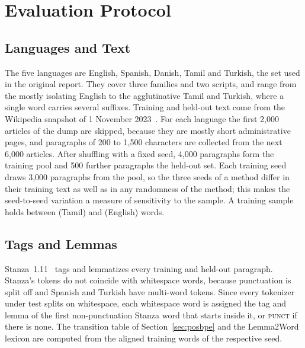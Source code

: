 \section{Evaluation Protocol}\label{sec:protocol}

\subsection{Languages and Text}
The five languages are English, Spanish, Danish, Tamil and Turkish, the set used in the original report.
They cover three families and two scripts, and range from the mostly isolating English to the agglutinative Tamil and Turkish, where a single word carries several suffixes.
Training and held-out text come from the Wikipedia snapshot of 1 November 2023~\cite{wikimedia2023dump}.
For each language the first 2,000 articles of the dump are skipped, because they are mostly short administrative pages, and paragraphs of 200 to 1,500 characters are collected from the next 6,000 articles.
After shuffling with a fixed seed, 4,000 paragraphs form the training pool and 500 further paragraphs the held-out set.
Each training seed draws 3,000 paragraphs from the pool, so the three seeds of a method differ in their training text as well as in any randomness of the method; this makes the seed-to-seed variation a measure of sensitivity to the sample.
A training sample holds between \nTrainWordsTamil{} (Tamil) and \nTrainWordsEnglish{} (English) words.

\subsection{Tags and Lemmas}
Stanza~1.11~\cite{qi2020stanza} tags and lemmatizes every training and held-out paragraph.
Stanza's tokens do not coincide with whitespace words, because punctuation is split off and Spanish and Turkish have multi-word tokens.
Since every tokenizer under test splits on whitespace, each whitespace word is assigned the tag and lemma of the first non-punctuation Stanza word that starts inside it, or \textsc{punct} if there is none.
The transition table of Section~\ref{sec:posbpe} and the Lemma2Word lexicon are computed from the aligned training words of the respective seed.

